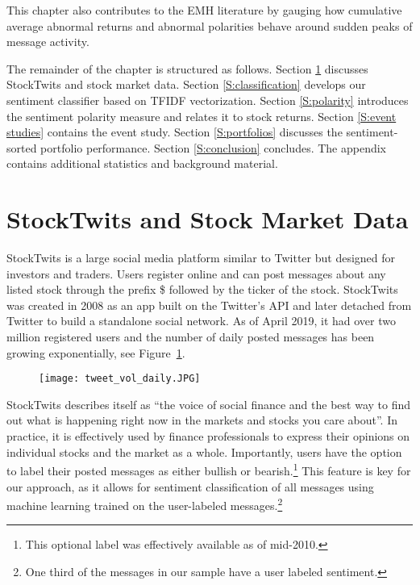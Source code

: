 This chapter also contributes to the EMH literature by gauging how cumulative average abnormal returns and abnormal polarities behave around sudden peaks of message activity. 



The remainder of the chapter is structured as follows. Section \ref{S:data} discusses StockTwits and stock market data. Section \ref{S:classification} develops our sentiment classifier based on TFIDF vectorization. Section \ref{S:polarity} introduces the sentiment polarity measure and relates it to stock returns. Section \ref{S:event studies} contains the event study. Section \ref{S:portfolios} discusses the sentiment-sorted portfolio performance. Section \ref{S:conclusion} concludes. The appendix contains additional statistics and background material.


\section{StockTwits and Stock Market Data}
\label{S:data}

StockTwits is a large social media platform similar to Twitter but designed for investors and traders. Users register online and can post messages about any listed stock through the prefix \$ followed by the ticker of the stock. StockTwits was created in 2008 as an app built on the Twitter's API and later detached from Twitter to build a standalone social network. As of April 2019, it had over two million registered users and the number of daily posted messages has been growing exponentially, see Figure~\ref{fig:tweet_vol_daily}. 

\clearpage 

\begin{figure}[h]
    \centering
    \texttt{[image: tweet\_vol\_daily.JPG]}
    \label{fig:tweet_vol_daily}
\end{figure}


StockTwits describes itself as ``the voice of social finance and the best way to find out what is happening right now in the markets and stocks you care about''. In practice, it is effectively used by finance professionals to express their opinions on individual stocks and the market as a whole. Importantly, users have the option to label their posted messages as either bullish or bearish.\footnote{This optional label was effectively available as of mid-2010.} This feature is key for our approach, as it allows for sentiment classification of all messages using machine learning trained on the user-labeled messages.\footnote{One third of the messages in our sample have a user labeled sentiment.} 

